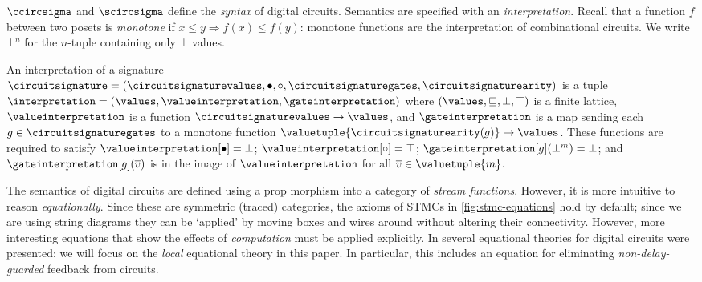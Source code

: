 \(\ccircsigma\) and \(\scircsigma\) define the \emph{syntax} of digital
circuits.
Semantics are specified with an \emph{interpretation}.
Recall that a function \(f\) between two posets is \emph{monotone}
if \(x \leq y \Rightarrow f(x) \leq f(y)\): monotone functions are the
interpretation of combinational circuits.
We write \(\bot^n\) for the \(n\)-tuple containing only \(\bot\) values.

\begin{definition}\label{def:interpretation}
    An interpretation of a signature \(
        \circuitsignature = (
            \circuitsignaturevalues,
            \bullet,
            \circ,
            \circuitsignaturegates,
            \circuitsignaturearity
        )
    \) is a tuple \(
        \interpretation = (
            \values,
            \valueinterpretation,
            \gateinterpretation
        )
    \) where \((\values,\sqsubseteq, \bot,\top)\) is a finite lattice,
    \(\valueinterpretation\) is a function
    \(\circuitsignaturevalues \to \values\),
    and \(\gateinterpretation\) is a map sending each \(
        g \in \circuitsignaturegates
    \) to a monotone function \(
        \valuetuple{\circuitsignaturearity(g)} \to \values
    \). These functions are required to satisfy \(
        \valueinterpretation[\bullet] = \bot
    \); \(
        \valueinterpretation[\circ] = \top
    \); \(
        \gateinterpretation[g](\bot^m) = \bot
    \); and \(
        \gateinterpretation[g](\overline{v})
    \) is in the image of \(\valueinterpretation\) for all \(
        \overline{v} \in \valuetuple{m}
    \).
\end{definition}

The semantics of digital circuits are defined using a prop morphism into
a category of \emph{stream functions}.
However, it is more intuitive to reason \emph{equationally}.
Since these are symmetric (traced) categories, the axioms of STMCs in
\cref{fig:stmc-equations} hold by default; since we are using string diagrams
they can be `applied' by moving boxes and wires around without altering their
connectivity.
However, more interesting equations that show the effects of \emph{computation}
must be applied explicitly.
In \cite{ghica2022compositional} several equational theories for digital
circuits were presented: we will focus on the \emph{local} equational theory
in this paper.
In particular, this includes an equation for eliminating
\emph{non-delay-guarded} feedback from circuits.

